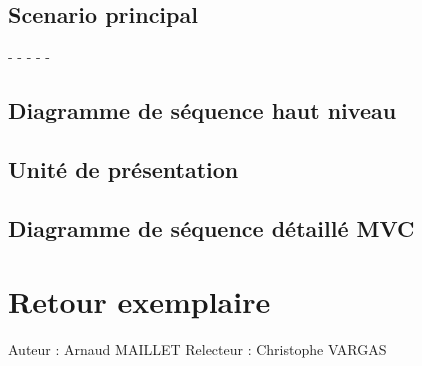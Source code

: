 \documentclass[a4paper,10pt]{report}
\begin{document}
\bigskip
\section*{Scenario principal}
\begin{flushleft}
-
-
-
-
-
\end{flushleft}

\bigskip

\section*{Diagramme de séquence haut niveau}

\newpage

\section*{Unité de présentation}

\section*{Diagramme de séquence détaillé MVC}

\newpage


\chapter*{Retour exemplaire}

Auteur : Arnaud MAILLET
Relecteur : Christophe VARGAS

\bigskip
\end{document}
